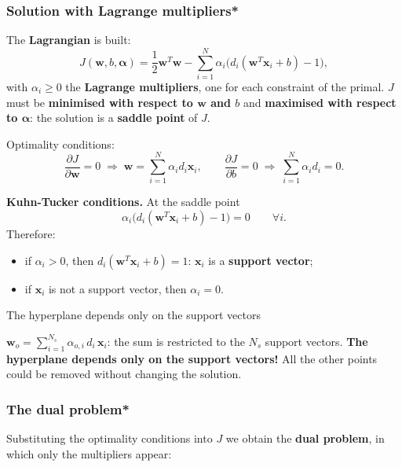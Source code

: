 \subsubsection{Solution with Lagrange
multipliers*}\label{soluzione-con-i-moltiplicatori-di-lagrange}

The \textbf{Lagrangian} is built: \[
J(\mathbf{w}, b, \boldsymbol{\alpha}) = \frac{1}{2}\mathbf{w}^T\mathbf{w} - \sum_{i=1}^{N}\alpha_i\big(d_i(\mathbf{w}^T\mathbf{x}_i + b) - 1\big),
\] with \(\alpha_i \ge 0\) the \textbf{Lagrange multipliers}, one for
each constraint of the primal. \(J\) must be \textbf{minimised with
respect to \(\mathbf{w}\) and \(b\)} and \textbf{maximised with respect
to \(\boldsymbol{\alpha}\)}: the solution is a \textbf{saddle point} of
\(J\).

Optimality conditions: \[
\frac{\partial J}{\partial \mathbf{w}} = 0 \;\Rightarrow\; \mathbf{w} = \sum_{i=1}^{N}\alpha_i d_i\mathbf{x}_i, \qquad \frac{\partial J}{\partial b} = 0 \;\Rightarrow\; \sum_{i=1}^{N}\alpha_i d_i = 0.
\]

\textbf{Kuhn-Tucker conditions.} At the saddle point \[
\alpha_i\big(d_i(\mathbf{w}^T\mathbf{x}_i + b) - 1\big) = 0 \qquad \forall i.
\] Therefore:

\begin{itemize}
\tightlist
\item
  if \(\alpha_i > 0\), then \(d_i(\mathbf{w}^T\mathbf{x}_i + b) = 1\):
  \(\mathbf{x}_i\) is a \textbf{support vector};
\item
  if \(\mathbf{x}_i\) is not a support vector, then \(\alpha_i = 0\).
\end{itemize}

\begin{boxtip}{The hyperplane depends only on the support vectors}

\(\mathbf{w}_o = \sum_{i=1}^{N_s}\alpha_{o,i}\,d_i\,\mathbf{x}_i\): the
sum is restricted to the \(N_s\) support vectors. \textbf{The
hyperplane depends only on the support vectors!} All the other points
could be removed without changing the solution.

\end{boxtip}

\subsubsection{The dual problem*}\label{il-problema-duale}

Substituting the optimality conditions into \(J\) we obtain the
\textbf{dual problem}, in which only the multipliers appear:

